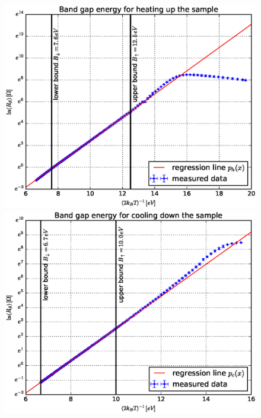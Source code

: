 \documentclass[a4paper]{article}
\begin{document}
\begin{figure}[H]
	\begin{minipage}[t]{0.5\textwidth}
		\begin{center}
		\includegraphics[width=1.0\textwidth]{plots/energy_gap_heating.eps}
		\end{center}
	\end{minipage}
	\begin{minipage}[t]{0.5\textwidth}
		\begin{center}
		\includegraphics[width=1.0\textwidth]{plots/energy_gap_cooling.eps}
		\end{center}

\end{minipage}
\end{figure}
\end{document}
